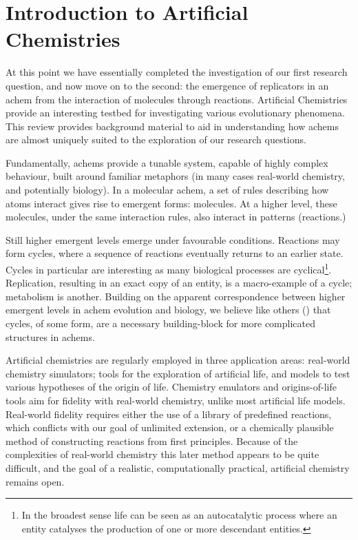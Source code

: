 \chapter{Introduction to Artificial Chemistries}\label{introduction-to-achems}

At this point we have essentially completed the investigation of our first research question, and now move on to the second: the emergence of replicators in an \gls{achem} from the interaction of molecules through reactions. Artificial Chemistries provide an interesting testbed for investigating various evolutionary phenomena. This review  provides background material to aid in understanding how \glspl{achem} are almost uniquely suited to the exploration of our research questions.

Fundamentally, \glspl{achem} provide a tunable system, capable of highly complex behaviour, built around familiar metaphors (in many cases real-world chemistry, and potentially biology). In a molecular \gls{achem}, a set of rules describing how atoms interact gives rise to emergent forms: molecules. At a higher level, these molecules, under the same interaction rules, also interact in patterns (reactions.)

Still higher emergent levels emerge under favourable conditions. Reactions may form cycles, where a sequence of reactions eventually returns to an earlier state. Cycles in particular are interesting as many biological processes are cyclical\footnote{In the broadest sense life can be seen as an autocatalytic process where an entity catalyses the production of one or more descendant entities.}. Replication, resulting in an exact copy of an entity, is a macro-example of a cycle; metabolism is another. Building on the apparent correspondence between higher emergent levels in \gls{achem} evolution and biology, we believe like others (\eg \textcite{Steel2013}) that cycles, of some form, are a necessary building-block for more complicated structures in \glspl{achem}.

Artificial chemistries are regularly employed in three application areas: real-world chemistry simulators; tools for the exploration of artificial life, and models to test various hypotheses of the origin of life. Chemistry emulators and origins-of-life tools aim for fidelity with real-world chemistry, unlike most artificial life models. Real-world fidelity requires either the use of a library of predefined reactions, which conflicts with our goal of unlimited extension, or a chemically plausible method of constructing reactions from first principles. Because of the complexities of real-world chemistry this later method appears to be quite difficult, and the goal of a realistic, computationally practical, artificial chemistry remains open. 

